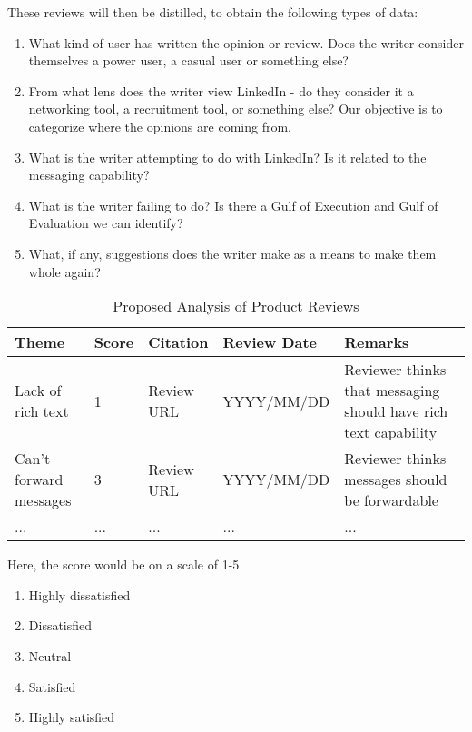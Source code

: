 \documentclass[
	letterpaper, %
]{jdf}
\begin{document}
These reviews will then be distilled, to obtain the following types of data:
\begin{enumerate}
    \item What kind of user has written the opinion or review.
    Does the writer consider themselves a power user, a casual user or something else?
    \item From what lens does the writer view LinkedIn - do they consider it a networking tool, a recruitment tool, or something else? Our objective is to categorize where the opinions are coming from.
    \item What is the writer attempting to do with LinkedIn? Is it related to the messaging capability?
    \item What is the writer failing to do? Is there a Gulf of Execution and Gulf of Evaluation we can identify?
    \item What, if any, suggestions does the writer make as a means to make them whole again?
\end{enumerate}

\begin{table}[h] %
	\caption{Proposed Analysis of Product Reviews}
	\small %
	\centering %
	\begin{tabular}{L{0.2\linewidth} C{0.05\linewidth} L{0.15\linewidth} L{0.2\linewidth}  L{0.4\linewidth}}
		\textbf{Theme} & \textbf{Score} & \textbf{Citation} & \textbf{Review Date} & \textbf{Remarks}\\
		\toprule[0.5pt]
		Lack of rich text & 1 & Review URL & YYYY/MM/DD & Reviewer thinks that messaging should have rich text capability\\
		\midrule
		Can't forward messages & 3 & Review URL & YYYY/MM/DD & Reviewer thinks messages should be forwardable\\
		\midrule
		... & ... & ... & ... & ...\\
		\midrule
	\end{tabular}
\end{table}

Here, the score would be on a scale of 1-5
\begin{enumerate}
    \item Highly dissatisfied
    \item Dissatisfied
    \item Neutral
    \item Satisfied
    \item Highly satisfied
\end{enumerate}
\end{document}
